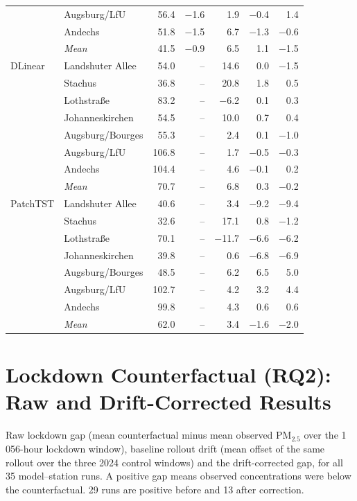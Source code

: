 \begin{table}[!htbp]
\begin{tabular}{llrrrrr}
 & Augsburg/LfU & 56.4 & $-$1.6 & 1.9 & $-$0.4 & 1.4 \\
 & Andechs & 51.8 & $-$1.5 & 6.7 & $-$1.3 & $-$0.6 \\
 & \textit{Mean} & 41.5 & $-$0.9 & 6.5 & 1.1 & $-$1.5 \\
\midrule
DLinear & Landshuter Allee & 54.0 & -- & 14.6 & 0.0 & $-$1.5 \\
 & Stachus & 36.8 & -- & 20.8 & 1.8 & 0.5 \\
 & Lothstra{\ss}e & 83.2 & -- & $-$6.2 & 0.1 & 0.3 \\
 & Johanneskirchen & 54.5 & -- & 10.0 & 0.7 & 0.4 \\
 & Augsburg/Bourges & 55.3 & -- & 2.4 & 0.1 & $-$1.0 \\
 & Augsburg/LfU & 106.8 & -- & 1.7 & $-$0.5 & $-$0.3 \\
 & Andechs & 104.4 & -- & 4.6 & $-$0.1 & 0.2 \\
 & \textit{Mean} & 70.7 & -- & 6.8 & 0.3 & $-$0.2 \\
\midrule
PatchTST & Landshuter Allee & 40.6 & -- & 3.4 & $-$9.2 & $-$9.4 \\
 & Stachus & 32.6 & -- & 17.1 & 0.8 & $-$1.2 \\
 & Lothstra{\ss}e & 70.1 & -- & $-$11.7 & $-$6.6 & $-$6.2 \\
 & Johanneskirchen & 39.8 & -- & 0.6 & $-$6.8 & $-$6.9 \\
 & Augsburg/Bourges & 48.5 & -- & 6.2 & 6.5 & 5.0 \\
 & Augsburg/LfU & 102.7 & -- & 4.2 & 3.2 & 4.4 \\
 & Andechs & 99.8 & -- & 4.3 & 0.6 & 0.6 \\
 & \textit{Mean} & 62.0 & -- & 3.4 & $-$1.6 & $-$2.0 \\
\bottomrule
\end{tabular}
\end{table}


\FloatBarrier
\section{Lockdown Counterfactual (RQ2): Raw and Drift-Corrected Results}
\label{app:rq2}

Raw lockdown gap (mean counterfactual minus mean observed PM$_{2.5}$ over the 1\,056-hour lockdown window), baseline rollout drift (mean offset of the same rollout over the three 2024 control windows) and the drift-corrected gap, for all 35 model--station runs. A positive gap means observed concentrations were below the counterfactual. 29 runs are positive before and 13 after correction.


